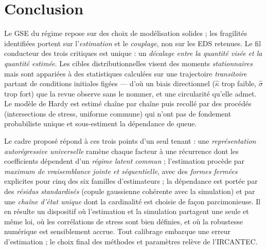 \documentclass[11pt,a4paper]{article}
\theoremstyle{definition}
\begin{document}
\section{Conclusion}

Le GSE du régime repose sur des choix de modélisation solides ; les fragilités identifiées portent sur l'\emph{estimation} et le \emph{couplage}, non sur les EDS retenues. Le fil conducteur des trois critiques est unique : un \emph{décalage entre la quantité visée et la quantité estimée}. Les cibles distributionnelles visent des moments \emph{stationnaires} mais sont appariées à des statistiques calculées sur une trajectoire \emph{transitoire} partant de conditions initiales figées --- d'où un biais directionnel ($\hat\kappa$ trop faible, $\hat\sigma$ trop fort) que la revue observe sans le nommer, et une circularité qu'elle admet. Le modèle de Hardy est estimé chaîne par chaîne puis recollé par des procédés (intersections de stress, uniforme commune) qui n'ont pas de fondement probabiliste unique et sous-estiment la dépendance de queue.

Le cadre proposé répond à ces trois points d'un seul tenant : une \emph{représentation autorégressive universelle} ramène chaque facteur à une récurrence dont les coefficients dépendent d'un \emph{régime latent commun} ; l'estimation procède par \emph{maximum de vraisemblance jointe et séquentielle}, avec des \emph{formes fermées} explicites pour cinq des six familles d'estimateurs ; la dépendance est portée par des \emph{résidus standardisés} (copule gaussienne cohérente avec la simulation) et par une \emph{chaîne d'état unique} dont la cardinalité est choisie de façon parcimonieuse. Il en résulte un dispositif où l'estimation et la simulation partagent une seule et même loi, où les corrélations de stress sont bien définies, et où la robustesse numérique est sensiblement accrue. Tout calibrage embarque une erreur d'estimation ; le choix final des méthodes et paramètres relève de l'IRCANTEC.
\end{document}
